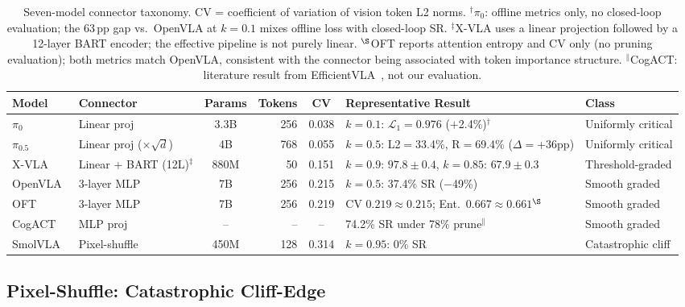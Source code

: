 \begin{table}[t]
\centering
\small
\caption{Seven-model connector taxonomy. CV = coefficient of variation of vision token L2 norms. $^\dagger\pi_0$: offline metrics only, no closed-loop evaluation; the 63\,pp gap vs.\ OpenVLA at $k{=}0.1$ mixes offline loss with closed-loop SR. $^\ddagger$X-VLA uses a linear projection followed by a 12-layer BART encoder; the effective pipeline is not purely linear. $^\S$OFT reports attention entropy and CV only (no pruning evaluation); both metrics match OpenVLA, consistent with the connector being associated with token importance structure. $^\|$CogACT: literature result from EfficientVLA~\cite{yang2025efficientvla}, not our evaluation.}
\label{tab:taxonomy}
\begin{tabular}{llcrcll}
\toprule
Model & Connector & Params & Tokens & CV & Representative Result & Class \\
\midrule
$\pi_0$~\cite{black2024pi0} & Linear proj & 3.3B & 256 & 0.038 & $k{=}0.1$: $\mathcal{L}_1{=}0.976$ ($+$2.4\%)$^\dagger$ & Uniformly critical \\
$\pi_0.5$~\cite{black2025pi05} & Linear proj ($\times\!\sqrt{d}$) & 4B & 768 & 0.055 & $k{=}0.5$: L2$=$33.4\%, R$=$69.4\% ($\Delta{=}$+36pp) & Uniformly critical \\
X-VLA~\cite{zheng2025xvla} & Linear + BART (12L)$^\ddagger$ & 880M & 50 & 0.151 & $k{=}0.9$: $97.8{\pm}0.4$, $k{=}0.85$: $67.9{\pm}0.3$ & Threshold-graded \\
OpenVLA~\cite{kim2024openvla} & 3-layer MLP & 7B & 256 & 0.215 & $k{=}0.5$: 37.4\% SR ($-$49\%) & Smooth graded \\
OFT~\cite{kim2025openoft} & 3-layer MLP & 7B & 256 & 0.219 & CV $0.219 \approx 0.215$; Ent.\ $0.667 \approx 0.661$$^\S$ & Smooth graded \\
CogACT~\cite{li2024cogact} & MLP proj & -- & -- & -- & 74.2\% SR under 78\% prune$^\|$ & Smooth graded \\
SmolVLA~\cite{shukor2025smolvla} & Pixel-shuffle & 450M & 128 & 0.314 & $k{=}0.95$: 0\% SR & Catastrophic cliff \\
\bottomrule
\end{tabular}
\end{table}

\subsection{Pixel-Shuffle: Catastrophic Cliff-Edge}
\label{sec:smolvla_results}

